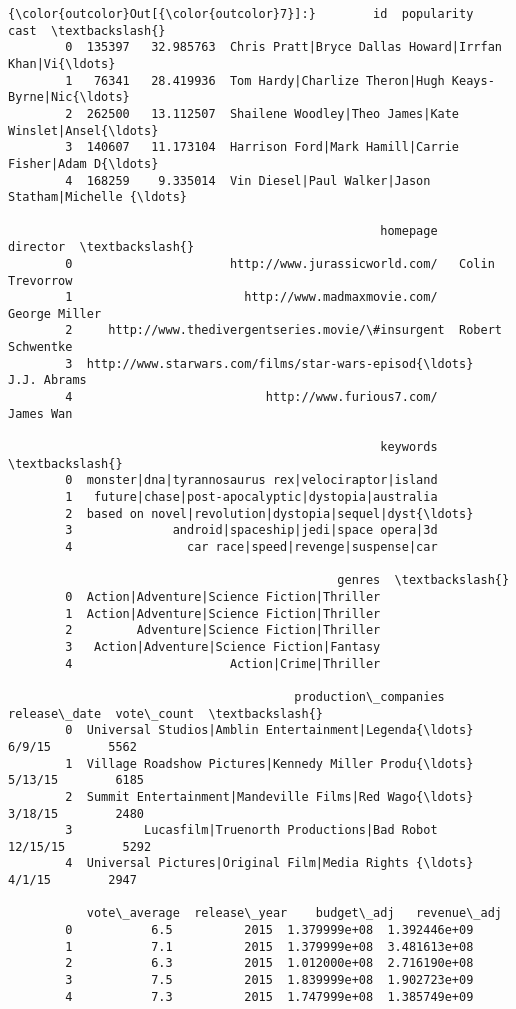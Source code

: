\documentclass[11pt]{article}
\begin{document}
\begin{Verbatim}[commandchars=\\\{\}]
{\color{outcolor}Out[{\color{outcolor}7}]:}        id  popularity                                               cast  \textbackslash{}
        0  135397   32.985763  Chris Pratt|Bryce Dallas Howard|Irrfan Khan|Vi{\ldots}   
        1   76341   28.419936  Tom Hardy|Charlize Theron|Hugh Keays-Byrne|Nic{\ldots}   
        2  262500   13.112507  Shailene Woodley|Theo James|Kate Winslet|Ansel{\ldots}   
        3  140607   11.173104  Harrison Ford|Mark Hamill|Carrie Fisher|Adam D{\ldots}   
        4  168259    9.335014  Vin Diesel|Paul Walker|Jason Statham|Michelle {\ldots}   
        
                                                    homepage          director  \textbackslash{}
        0                      http://www.jurassicworld.com/   Colin Trevorrow   
        1                        http://www.madmaxmovie.com/     George Miller   
        2     http://www.thedivergentseries.movie/\#insurgent  Robert Schwentke   
        3  http://www.starwars.com/films/star-wars-episod{\ldots}       J.J. Abrams   
        4                           http://www.furious7.com/         James Wan   
        
                                                    keywords  \textbackslash{}
        0  monster|dna|tyrannosaurus rex|velociraptor|island   
        1   future|chase|post-apocalyptic|dystopia|australia   
        2  based on novel|revolution|dystopia|sequel|dyst{\ldots}   
        3              android|spaceship|jedi|space opera|3d   
        4                car race|speed|revenge|suspense|car   
        
                                              genres  \textbackslash{}
        0  Action|Adventure|Science Fiction|Thriller   
        1  Action|Adventure|Science Fiction|Thriller   
        2         Adventure|Science Fiction|Thriller   
        3   Action|Adventure|Science Fiction|Fantasy   
        4                      Action|Crime|Thriller   
        
                                        production\_companies release\_date  vote\_count  \textbackslash{}
        0  Universal Studios|Amblin Entertainment|Legenda{\ldots}       6/9/15        5562   
        1  Village Roadshow Pictures|Kennedy Miller Produ{\ldots}      5/13/15        6185   
        2  Summit Entertainment|Mandeville Films|Red Wago{\ldots}      3/18/15        2480   
        3          Lucasfilm|Truenorth Productions|Bad Robot     12/15/15        5292   
        4  Universal Pictures|Original Film|Media Rights {\ldots}       4/1/15        2947   
        
           vote\_average  release\_year    budget\_adj   revenue\_adj  
        0           6.5          2015  1.379999e+08  1.392446e+09  
        1           7.1          2015  1.379999e+08  3.481613e+08  
        2           6.3          2015  1.012000e+08  2.716190e+08  
        3           7.5          2015  1.839999e+08  1.902723e+09  
        4           7.3          2015  1.747999e+08  1.385749e+09  
\end{Verbatim}
            
\end{document}
